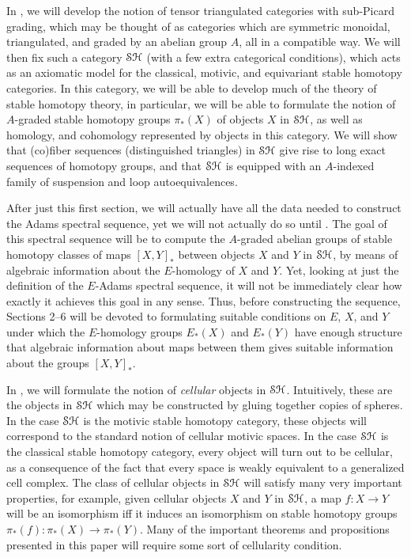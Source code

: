 \documentclass[../main.tex]{subfiles}
\begin{document}
In , we will develop the notion of tensor triangulated categories with sub-Picard grading, which may be thought of as categories which are symmetric monoidal, triangulated, and graded by an abelian group $A$, all in a compatible way. We will then fix such a category $\mathcal{SH}$ (with a few extra categorical conditions), which acts as an axiomatic model for the classical, motivic, and equivariant stable homotopy categories. In this category, we will be able to develop much of the theory of stable homotopy theory, in particular, we will be able to formulate the notion of $A$-graded stable homotopy groups $\pi_*(X)$ of objects $X$ in $\mathcal{SH}$, as well as homology, and cohomology represented by objects in this category. We will show that (co)fiber sequences (distinguished triangles) in $\mathcal{SH}$ give rise to long exact sequences of homotopy groups, and that $\mathcal{SH}$ is equipped with an $A$-indexed family of suspension and loop autoequivalences.

After just this first section, we will actually have all the data needed to construct the Adams spectral sequence, yet we will not actually do so until . The goal of this spectral sequence will be to compute the $A$-graded abelian groups of stable homotopy classes of maps ${[X,Y]}_*$ between objects $X$ and $Y$ in $\mathcal{SH}$, by means of algebraic information about the $E$-homology of $X$ and $Y$. Yet, looking at just the definition of the $E$-Adams spectral sequence, it will not be immediately clear how exactly it achieves this goal in any sense. Thus, before constructing the sequence, Sections 2--6 will be devoted to formulating suitable conditions on $E$, $X$, and $Y$ under which the $E$-homology groups $E_*(X)$ and $E_*(Y)$ have enough structure that algebraic information about maps between them gives suitable information about the groups ${[X,Y]}_*$.

In , we will formulate the notion of \emph{cellular} objects in $\mathcal{SH}$. Intuitively, these are the objects in $\mathcal{SH}$ which may be constructed by gluing together copies of spheres. In the case $\mathcal{SH}$ is the motivic stable homotopy category, these objects will correspond to the standard notion of cellular motivic spaces. In the case $\mathcal{SH}$ is the classical stable homotopy category, every object will turn out to be cellular, as a consequence of the fact that every space is weakly equivalent to a generalized cell complex. The class of cellular objects in $\mathcal{SH}$ will satisfy many very important properties, for example, given cellular objects $X$ and $Y$ in $\mathcal{SH}$, a map $f:X\to Y$ will be an isomorphism iff it induces an isomorphism on stable homotopy groups $\pi_*(f):\pi_*(X)\to\pi_*(Y)$. Many of the important theorems and propositions presented in this paper will require some sort of cellularity condition.
\end{document}
